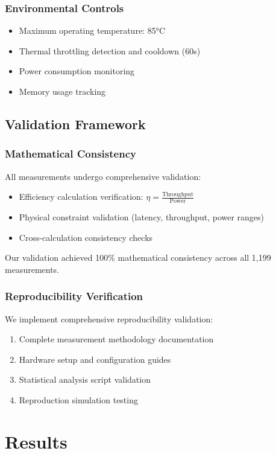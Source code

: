 \documentclass[12pt,draftcls,onecolumn]{IEEEtran}
\begin{document}
\subsubsection{Environmental Controls}
\begin{itemize}
    \item Maximum operating temperature: 85°C
    \item Thermal throttling detection and cooldown (60s)
    \item Power consumption monitoring
    \item Memory usage tracking
\end{itemize}

\subsection{Validation Framework}

\subsubsection{Mathematical Consistency}
All measurements undergo comprehensive validation:
\begin{itemize}
    \item Efficiency calculation verification: $\eta = \frac{\text{Throughput}}{\text{Power}}$
    \item Physical constraint validation (latency, throughput, power ranges)
    \item Cross-calculation consistency checks
\end{itemize}

Our validation achieved 100\% mathematical consistency across all 1,199 measurements.

\subsubsection{Reproducibility Verification}
We implement comprehensive reproducibility validation:
\begin{enumerate}
    \item Complete measurement methodology documentation
    \item Hardware setup and configuration guides
    \item Statistical analysis script validation
    \item Reproduction simulation testing
\end{enumerate}

\section{Results}
\end{document}
